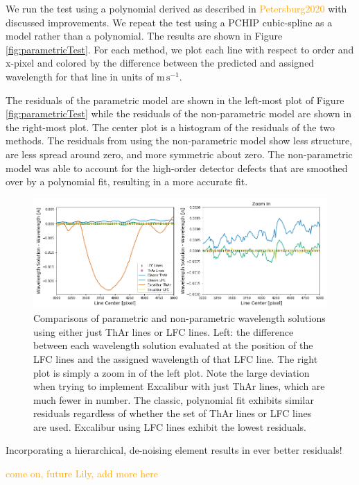 \documentclass[12pt, letterpaper]{article}
\newcommand{\lz}[1]{\textcolor{orange}{#1}}
\newcommand{\mps}{\mathrm{m\,s^{-1}}}
\begin{document}
We run the test using a polynomial derived as described in \lz{Petersburg2020} with discussed improvements.  We repeat the test using a PCHIP cubic-spline as a model rather than a polynomial.  The results are shown in Figure \ref{fig:parametricTest}.  For each method, we plot each line with respect to order and x-pixel and colored by the difference between the predicted and assigned wavelength for that line in units of $\mps$.

The residuals of the parametric model are shown in the left-most plot of Figure \ref{fig:parametricTest} while the residuals of the non-parametric model are shown in the right-most plot.  The center plot is a histogram of the residuals of the two methods.  The residuals from using the non-parametric model show less structure, are less spread around zero, and more symmetric about zero.  The non-parametric model was able to account for the high-order detector defects that are smoothed over by a polynomial fit, resulting in a more accurate fit.

\begin{figure}[h]
\centering
\includegraphics[width=\textwidth]{Figures/waveResids.png}
\caption{Comparisons of parametric and non-parametric wavelength solutions using either just ThAr lines or LFC lines. Left: the difference between each wavelength solution evaluated at the position of the LFC lines and the assigned wavelength of that LFC line.  The right plot is simply a zoom in of the left plot.  Note the large deviation when trying to implement Excalibur with just ThAr lines, which are much fewer in number.  The classic, polynomial  fit exhibits similar residuals regardless of whether the set of ThAr lines or LFC lines are used.  Excalibur using LFC lines exhibit the lowest residuals.}
\label{fig:waveResids}
\end{figure} 

Incorporating a hierarchical, de-noising element results in ever better residuals!

\lz{come on, future Lily, add more here}
\end{document}
